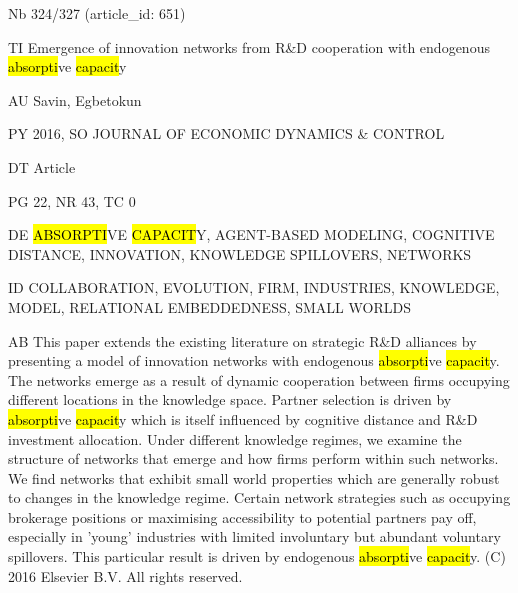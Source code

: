 \documentclass[a4paper]{article}
\begin{document}
\vspace*{-2cm}
Nb \tabto{0cm}324/327 (article\_id: 651)\par
TI \tabto{0cm}Emergence of innovation networks from R\&D cooperation with endogenous \hl{absorpti}ve \hl{capacit}y\par
AU \tabto{0cm}Savin, Egbetokun\par
PY \tabto{0cm}2016, SO JOURNAL OF ECONOMIC DYNAMICS \& CONTROL\par
DT \tabto{0cm}Article\par
PG \tabto{0cm}22, NR 43, TC 0\par
DE \tabto{0cm}\hl{ABSORPTI}VE \hl{CAPACIT}Y, AGENT-BASED MODELING, COGNITIVE DISTANCE, INNOVATION, KNOWLEDGE SPILLOVERS, NETWORKS\par
ID \tabto{0cm}COLLABORATION, EVOLUTION, FIRM, INDUSTRIES, KNOWLEDGE, MODEL, RELATIONAL EMBEDDEDNESS, SMALL WORLDS\par
AB \tabto{0cm}This paper extends the existing literature on strategic R\&D alliances by presenting a model of innovation networks with endogenous \hl{absorpti}ve \hl{capacit}y. The networks emerge as a result of dynamic cooperation between firms occupying different locations in the knowledge space. Partner selection is driven by \hl{absorpti}ve \hl{capacit}y which is itself influenced by cognitive distance and R\&D investment allocation. Under different knowledge regimes, we examine the structure of networks that emerge and how firms perform within such networks. We find networks that exhibit small world properties which are generally robust to changes in the knowledge regime. Certain network strategies such as occupying brokerage positions or maximising accessibility to potential partners pay off, especially in 'young' industries with limited involuntary but abundant voluntary spillovers. This particular result is driven by endogenous \hl{absorpti}ve \hl{capacit}y. (C) 2016 Elsevier B.V. All rights reserved.\par
\clearpage
\end{document}
